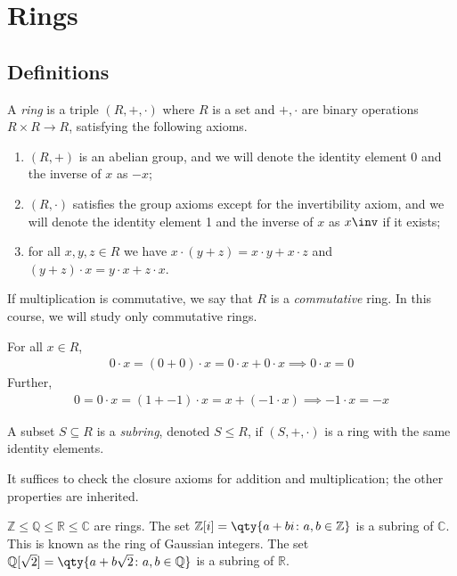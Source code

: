 \section{Rings}

\subsection{Definitions}
\begin{definition}
	A \textit{ring} is a triple $(R, +, \cdot)$ where $R$ is a set and $+, \cdot$ are binary operations $R \times R \to R$, satisfying the following axioms.
	\begin{enumerate}
		\item $(R, +)$ is an abelian group, and we will denote the identity element 0 and the inverse of $x$ as $-x$;
		\item $(R, \cdot)$ satisfies the group axioms except for the invertibility axiom, and we will denote the identity element 1 and the inverse of $x$ as $x\inv$ if it exists;
		\item for all $x, y, z \in R$ we have $x \cdot (y+z) = x\cdot y + x\cdot z$ and $(y+z)\cdot x = y \cdot x + z \cdot x$.
	\end{enumerate}
	If multiplication is commutative, we say that $R$ is a \textit{commutative} ring.
	In this course, we will study only commutative rings.
\end{definition}
\begin{remark}
	For all $x \in R$,
	\begin{align*}
		0 \cdot x = (0+0) \cdot x = 0 \cdot x + 0 \cdot x \implies 0 \cdot x = 0
	\end{align*}
	Further,
	\begin{align*}
		0 = 0 \cdot x = (1 + -1) \cdot x = x + (-1 \cdot x) \implies -1 \cdot x = -x
	\end{align*}
\end{remark}
\begin{definition}
	A subset $S \subseteq R$ is a \textit{subring}, denoted $S \leq R$, if $(S, +, \cdot)$ is a ring with the same identity elements.
\end{definition}
\begin{remark}
	It suffices to check the closure axioms for addition and multiplication; the other properties are inherited.
\end{remark}
\begin{example}
	$\mathbb Z \leq \mathbb Q \leq \mathbb R \leq \mathbb C$ are rings.
	The set $\mathbb Z[i] = \qty{a+bi \colon a,b\in\mathbb Z}$ is a subring of $\mathbb C$.
	This is known as the ring of Gaussian integers.
	The set $\mathbb Q[\sqrt{2}] = \qty{a+b\sqrt{2} \colon a,b \in\mathbb Q}$ is a subring of $\mathbb R$.
\end{example}
